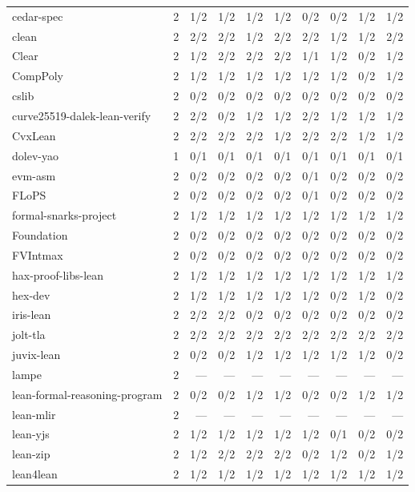 \documentclass{article}
\begin{document}
\begin{table}[h]
\begin{tabular}{lrrrrrrrrr}
    cedar-spec & 2 & 1/2 & 1/2 & 1/2 & 1/2 & 0/2 & 0/2 & 1/2 & 1/2 \\
    clean & 2 & 2/2 & 2/2 & 1/2 & 2/2 & 2/2 & 1/2 & 1/2 & 2/2 \\
    Clear & 2 & 1/2 & 2/2 & 2/2 & 2/2 & 1/1 & 1/2 & 0/2 & 1/2 \\
    CompPoly & 2 & 1/2 & 1/2 & 1/2 & 1/2 & 1/2 & 1/2 & 0/2 & 1/2 \\
    cslib & 2 & 0/2 & 0/2 & 0/2 & 0/2 & 0/2 & 0/2 & 0/2 & 0/2 \\
    curve25519-dalek-lean-verify & 2 & 2/2 & 0/2 & 1/2 & 1/2 & 2/2 & 1/2 & 1/2 & 1/2 \\
    CvxLean & 2 & 2/2 & 2/2 & 2/2 & 1/2 & 2/2 & 2/2 & 1/2 & 1/2 \\
    dolev-yao & 1 & 0/1 & 0/1 & 0/1 & 0/1 & 0/1 & 0/1 & 0/1 & 0/1 \\
    evm-asm & 2 & 0/2 & 0/2 & 0/2 & 0/2 & 0/1 & 0/2 & 0/2 & 0/2 \\
    FLoPS & 2 & 0/2 & 0/2 & 0/2 & 0/2 & 0/1 & 0/2 & 0/2 & 0/2 \\
    formal-snarks-project & 2 & 1/2 & 1/2 & 1/2 & 1/2 & 1/2 & 1/2 & 1/2 & 1/2 \\
    Foundation & 2 & 0/2 & 0/2 & 0/2 & 0/2 & 0/2 & 0/2 & 0/2 & 0/2 \\
    FVIntmax & 2 & 0/2 & 0/2 & 0/2 & 0/2 & 0/2 & 0/2 & 0/2 & 0/2 \\
    hax-proof-libs-lean & 2 & 1/2 & 1/2 & 1/2 & 1/2 & 1/2 & 1/2 & 1/2 & 1/2 \\
    hex-dev & 2 & 1/2 & 1/2 & 1/2 & 1/2 & 1/2 & 0/2 & 1/2 & 0/2 \\
    iris-lean & 2 & 2/2 & 2/2 & 0/2 & 0/2 & 0/2 & 0/2 & 0/2 & 0/2 \\
    jolt-tla & 2 & 2/2 & 2/2 & 2/2 & 2/2 & 2/2 & 2/2 & 2/2 & 2/2 \\
    juvix-lean & 2 & 0/2 & 0/2 & 1/2 & 1/2 & 1/2 & 1/2 & 1/2 & 0/2 \\
    lampe & 2 & --- & --- & --- & --- & --- & --- & --- & --- \\
    lean-formal-reasoning-program & 2 & 0/2 & 0/2 & 1/2 & 1/2 & 0/2 & 0/2 & 1/2 & 1/2 \\
    lean-mlir & 2 & --- & --- & --- & --- & --- & --- & --- & --- \\
    lean-yjs & 2 & 1/2 & 1/2 & 1/2 & 1/2 & 1/2 & 0/1 & 0/2 & 0/2 \\
    lean-zip & 2 & 1/2 & 2/2 & 2/2 & 2/2 & 0/2 & 1/2 & 0/2 & 1/2 \\
    lean4lean & 2 & 1/2 & 1/2 & 1/2 & 1/2 & 1/2 & 1/2 & 1/2 & 1/2 \\

\end{tabular}
\end{table}
\end{document}

